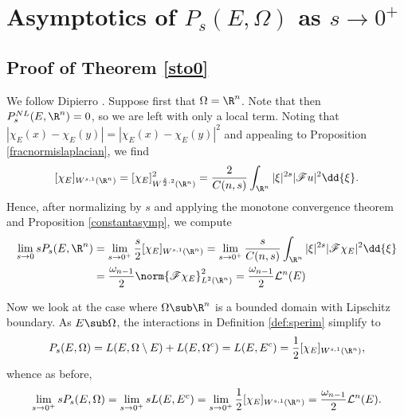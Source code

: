 \documentclass[../main.tex]{subfiles}
\begin{document}
\section{Asymptotics of $ P_{s}(E,\Omega) $ as $ s\to0^{+} $}

\subsection*{Proof of Theorem \ref{sto0}}
    We follow Dipierro \cite{dipierro:2013}. Suppose first that $ \Omega = \R^{n} $. Note that then $ P_{s}^{NL}(E,\R^{n}) = 0 $, so we are left with only a local term. Noting that $ | \chi_{E}(x) - \chi_{E}(y)| = | \chi_{E}(x) - \chi_{E}(y)|^{2} $ and appealing to Proposition \ref{fracnormislaplacian}, we find
    \[
        [\chi_{E}]_{W^{s,1}(\R^{n})} = [ \chi_{E} ]_{W^{\frac{s}{2},2}(\R^{n})}^{2} = \frac{2}{C(n,s)}\int_{\R^{n}}| \xi|^{2s}|\mathscr{F}u|^{2}\dd{\xi}.
    \] 
    Hence, after normalizing by $ s $ and applying the monotone convergence theorem and Proposition \ref{constantasymp}, we compute
    \begin{align*}
        \lim_{s\to 0} s P_{s}(E,\R^{n}) &= \lim_{s\to 0^{+}} \frac{s}{2}[ \chi_{E}]_{W^{s,1}(\R^{n})} = \lim_{s\to 0^{+}} \frac{s}{C(n,s)}\int_{\R^{n}}| \xi|^{2s}|\mathscr{F}\chi_{E}|^{2} \dd{\xi} \\
        &= \frac{\omega_{n-1}}{2} \norm{\mathscr{F} \chi_{E}}_{L^{2}(\R^{n})}^{2} = \frac{\omega_{n-1}}{2} \mathcal{L}^{n}(E)
    \end{align*}

    Now we look at the case where $ \Omega\sub \R^{n} $ is a bounded domain with Lipschitz boundary. As $ E\sub \Omega $, the interactions in Definition \ref{def:sperim} simplify to 
    \[
        P_{s}(E,\Omega) = L(E, \Omega\setminus E) + L(E, \Omega^{c}) = L(E,E^{c}) = \frac{1}{2}[ \chi_{E}]_{W^{s,1}(\R^{n})},
    \]
    whence as before,
    \[
        \lim_{s\to0^{+}}sP_{s}(E,\Omega) = \lim_{s\to0^{+}} sL(E,E^{c}) = \lim_{s\to0^{+}}\frac{1}{2}[ \chi_{E}]_{W^{s,1}(\R^{n})} = \frac{\omega_{n-1}}{2}\mathcal{L}^{n}(E).
    \]

\end{document}
